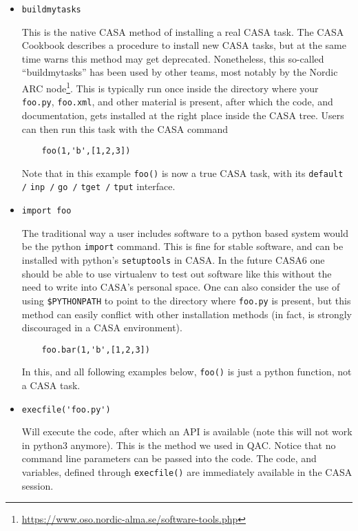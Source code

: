 \documentclass[12pt,a4paper]{article}
\begin{document}
\begin{itemize}

\item[1.] \verb+buildmytasks+

This is the native CASA method of installing a real CASA task. The CASA Cookbook describes a
procedure to install new CASA tasks, but at the same time warns this
method may get deprecated. Nonetheless, this so-called
``buildmytasks'' has been used by other teams, most notably by the Nordic ARC
node\footnote{\url{https://www.oso.nordic-alma.se/software-tools.php}}. This
is typically run once inside the directory where your {\tt foo.py}, {\tt foo.xml},
and other material is present, after which the code, and documentation, gets installed
at the right place inside the CASA tree. Users can then run this task with the CASA command

\footnotesize
\begin{verbatim}
    foo(1,'b',[1,2,3])
\end{verbatim}
\normalsize

Note that in this example \verb+foo()+
is now a true CASA task, with its
\verb+default /+
\verb+inp /+
\verb+go /+
\verb+tget /+
\verb+tput+
interface.

\item[2.] \verb+import foo+

The traditional way a user includes software to a python based system
would be the python {\tt import} command.
This is fine for stable software, and can be installed with python's
{\tt setuptools} in CASA. In the future CASA6 one should be able to use
virtualenv to test out software like this without the need to write
into CASA's personal space. One can also consider the use of using \verb+$PYTHONPATH+
to point to the directory where {\tt foo.py} is present, but this method can
easily conflict with other installation methods (in fact, is strongly discouraged
in a CASA environment).


\footnotesize
\begin{verbatim}
    foo.bar(1,'b',[1,2,3])
\end{verbatim}
\normalsize

In this, and all following examples below, \verb+foo()+ is just a python function, not a CASA task.


\item[3.] \verb+execfile('foo.py')+

Will execute the code,  after which an API is available  (note this will not work in python3 anymore).
This is the method we used in QAC. Notice that no command line parameters can be passed into
the code. The code, and variables, defined through {\tt execfile()} are immediately available
in the CASA session.


\end{itemize}
\end{document}
